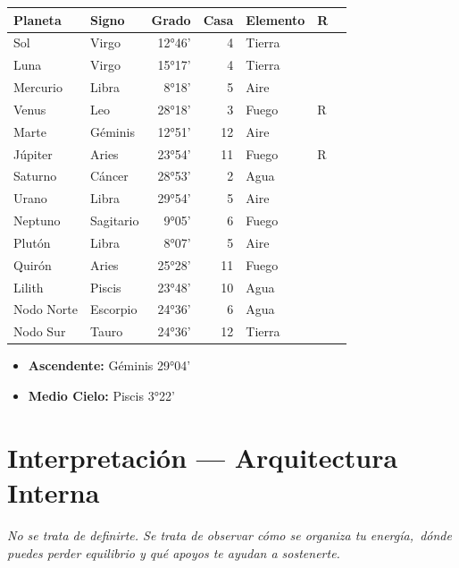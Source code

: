 \documentclass[11pt,a4paper]{article}\usepackage[utf8]{inputenc}
\begin{document}
\begin{center}
\begin{tabular}{llrrlll}
  \toprule
  \textbf{Planeta} & \textbf{Signo} & \textbf{Grado} & \textbf{Casa} &
  \textbf{Elemento} & \textbf{R} \\
  \midrule
  Sol & Virgo & 12°46' & 4 & Tierra &  \\
  Luna & Virgo & 15°17' & 4 & Tierra &  \\
  Mercurio & Libra & 8°18' & 5 & Aire &  \\
  Venus & Leo & 28°18' & 3 & Fuego & R \\
  Marte & Géminis & 12°51' & 12 & Aire &  \\
  Júpiter & Aries & 23°54' & 11 & Fuego & R \\
  Saturno & Cáncer & 28°53' & 2 & Agua &  \\
  Urano & Libra & 29°54' & 5 & Aire &  \\
  Neptuno & Sagitario & 9°05' & 6 & Fuego &  \\
  Plutón & Libra & 8°07' & 5 & Aire &  \\
  Quirón & Aries & 25°28' & 11 & Fuego &  \\
  Lilith & Piscis & 23°48' & 10 & Agua &  \\
  Nodo Norte & Escorpio & 24°36' & 6 & Agua &  \\
  Nodo Sur & Tauro & 24°36' & 12 & Tierra &  \\
  \bottomrule
\end{tabular}
\end{center}

\vspace{0.5cm}
\begin{itemize}
  \item \textbf{Ascendente:} Géminis 29°04'
  \item \textbf{Medio Cielo:} Piscis 3°22'
\end{itemize}

\newpage

\section{Interpretación — Arquitectura Interna}

\begin{center}
{\small\itshape
No se trata de definirte. Se trata de observar cómo se organiza tu energía,\
dónde puedes perder equilibrio y qué apoyos te ayudan a sostenerte.
}
\end{center}
\end{document}
